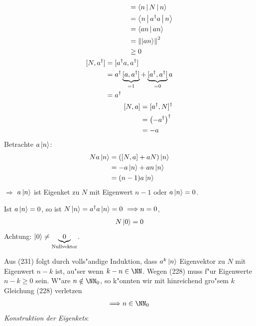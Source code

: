 \documentclass[a4paper]{scrartcl}
\begin{document}
{\begin{align}
\begin{split}
& = \Braket { n | N | n } \\
& = \Braket{ n | a^\dagger a | n } \\
& = \Braket {an | an} \\
& = \left\Vert \ket{an} \right\Vert^2 \\
& \geq 0 
\end{split} \\
\begin{split}
[N, a^\dagger] & = [a^\dagger a, a^\dagger] \\
& = a^\dagger \underbrace{ [a, a^\dagger] }_{=1} + \underbrace{ [a^\dagger, a^\dagger]}_{=0} a \\
& = a^\dagger
\end{split} \\
\begin{split}
[N, a] & = [a^\dagger, N]^\dagger \\
& = \left( -a^\dagger \right)^\dagger \\
& = -a
\end{split}
\end{align}
Betrachte $a \ket n$:
\begin{align}
\begin{split}
N a \ket n & = \left( [N, a] + aN \right) \ket n \\
& = - a \ket n + an \ket n \\
& = (n-1) a \ket n 
\end{split}
\end{align}
$\Longrightarrow$ $a \ket n $ ist Eigenket zu $N$ mit Eigenwert $n-1$ oder $a \ket n = 0$.

Ist $a \ket n = 0$, so ist $N \ket n = a^\dagger a \ket n =  0 \ \Longrightarrow n = 0$,
\begin{align}
N \ket 0 = 0
\end{align}
Achtung: $\ket 0 \neq \underbrace{0}_{\mathrm{Nullvektor}}$.

Aus (231) folgt durch volls"andige Induktion, dass $a^k \ket n$ Eigenvektor zu $N$ mit Eigenwert $n-k$ ist, au"ser wenn $k-n \in \NN$. Wegen (228) muss f"ur Eigenwerte $n-k \geq 0$ sein. W"are $n \notin \NN_0$, so k"onnten wir mit hinreichend gro"sem $k$ Gleichung (228) verletzen 
\begin{align}
\Longrightarrow n \in \NN_0
\end{align}
\emph{Konstruktion der Eigenkets}: 

}
\end{document}
